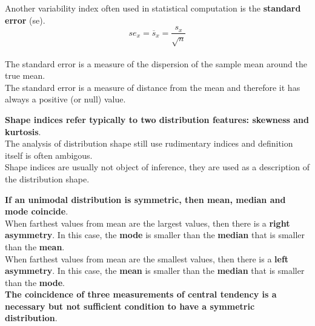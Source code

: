 
\begin{frame}
  \vspace*{.3cm}
  Another variability index often used in statistical computation is the \textbf{standard error} (se).\\
  \vspace*{.3cm}
  $$ se_x = \overline{s}_x = \frac{s_x}{\sqrt{n}} $$ \\
  \vspace*{.3cm}
  The standard error is a measure of the dispersion of the sample mean around the true mean.\\
  \vspace*{.3cm}
  The standard error is a measure of distance from the mean and therefore it has always a positive (or null) value. \\
\end{frame}




\begin{frame}
  \vspace*{.5cm}
  \textbf{Shape indices refer typically to two distribution features: skewness and kurtosis}.\\
  \vspace*{.5cm}
  The analysis of distribution shape still use rudimentary indices and definition itself is often ambigous.\\
  \vspace*{.5cm}
  Shape indices are usually not object of inference, they are used as a description of the distribution shape.
\end{frame}



\begin{frame}
  \vspace*{.2cm}
  \textbf{If an unimodal distribution is symmetric, then mean, median and mode coincide}.\\
  \vspace*{.2cm}
  When farthest values from mean are the largest values, then there is a \textbf{right asymmetry}. In this case, the \textbf{mode} is smaller than the \textbf{median} that is smaller than the \textbf{mean}.\\
  \vspace*{.2cm}
  When farthest values from mean are the smallest values, then there is a \textbf{left asymmetry}. In this case, the \textbf{mean} is smaller than the \textbf{median} that is smaller than the \textbf{mode}.\\
  \vspace*{.2cm}
  \textbf{The coincidence of three measurements of central tendency is a necessary but not sufficient condition to have a symmetric distribution}.
\end{frame}

